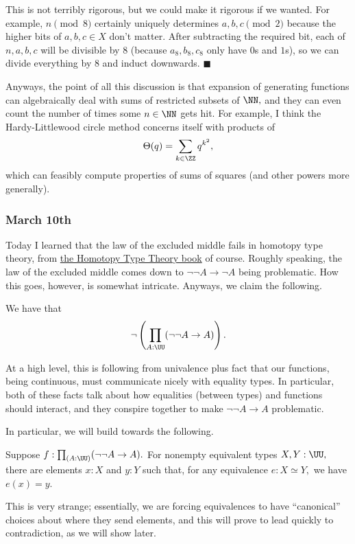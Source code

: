This is not terribly rigorous, but we could make it rigorous if we wanted. For example, $n\pmod8$ certainly uniquely determines $a,b,c\pmod2$ because the higher bits of $a,b,c\in X$ don't matter. After subtracting the required bit, each of $n,a,b,c$ will be divisible by $8$ (because $a_8,b_8,c_8$ only have $0$s and $1$s), so we can divide everything by $8$ and induct downwards. $\blacksquare$

Anyways, the point of all this discussion is that expansion of generating functions can algebraically deal with sums of restricted subsets of $\NN,$ and they can even count the number of times some $n\in\NN$ gets hit. For example, I think the Hardy-Littlewood circle method concerns itself with products of
\[\Theta(q)=\sum_{k\in\ZZ}q^{k^2},\]
which can feasibly compute properties of sums of squares (and other powers more generally).

\subsubsection{March 10th}
Today I learned that the law of the excluded middle fails in homotopy type theory, from \href{https://homotopytypetheory.org/book/}{the Homotopy Type Theory book} of course. Roughly speaking, the law of the excluded middle comes down to $\lnot\lnot A\to\lnot A$ being problematic. How this goes, however, is somewhat intricate. Anyways, we claim the following.
\begin{theorem}
    We have that
    \[\lnot\left(\prod_{A:\UU}(\lnot\lnot A\to A)\right).\]
\end{theorem}
At a high level, this is following from univalence plus fact that our functions, being continuous, must communicate nicely with equality types. In particular, both of these facts talk about how equalities (between types) and functions should interact, and they conspire together to make $\lnot\lnot A\to A$ problematic.

In particular, we will build towards the following.
\begin{lemma}
    Suppose $f:\prod_{(A:\UU)}(\lnot\lnot A\to A).$ For nonempty equivalent types $X,Y:\UU,$ there are elements $x:X$ and $y:Y$ such that, for any equivalence $e:X\simeq Y,$ we have $e(x)=y.$
\end{lemma}
This is very strange; essentially, we are forcing equivalences to have ``canonical'' choices about where they send elements, and this will prove to lead quickly to contradiction, as we will show later.


